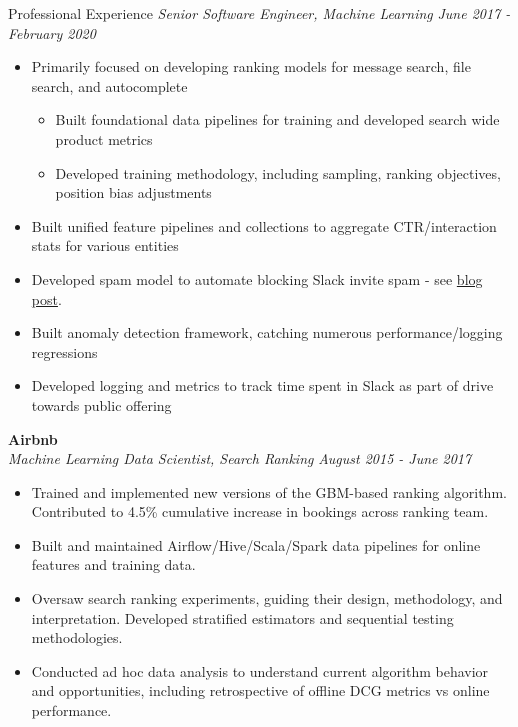 \documentclass{resume} %
\begin{document}
\begin{rSection}{Professional Experience}
{\em Senior Software Engineer, Machine Learning} \hfill {\em June 2017 - February 2020} \vspace{0.1em} 
\begin{itemize} \itemsep -0.2em
	\item Primarily focused on developing ranking models for message search, file search, and autocomplete
	\vspace{-0.2em}
        \begin{itemize} \itemsep -0.2em
        	\item Built foundational data pipelines for training and developed search wide product metrics
        	\item Developed training methodology, including sampling, ranking objectives, position bias adjustments
		\end{itemize}
	\item Built unified feature pipelines and collections to aggregate CTR/interaction stats for various entities
	\item Developed spam model to automate blocking Slack invite spam - see \href{https://slack.engineering/blocking-slack-invite-spam-with-machine-learning/}{blog post}.
	\item Built anomaly detection framework, catching numerous performance/logging regressions
	\item Developed logging and metrics to track time spent in Slack as part of drive towards public offering
\end{itemize}

{\bf Airbnb} \\
{\em Machine Learning Data Scientist, Search Ranking} \hfill {\em August 2015 - June 2017} \vspace{0.1em} 
\vspace{-0.2em}
\begin{itemize} \itemsep -0.2em
    \item Trained and implemented new versions of the GBM-based ranking algorithm. Contributed to 4.5\% cumulative increase in bookings across ranking team.
    \item Built and maintained Airflow/Hive/Scala/Spark data pipelines for online features and training data.
    \item Oversaw search ranking experiments, guiding their design, methodology, and interpretation. Developed stratified estimators and sequential testing methodologies.
    \item Conducted ad hoc data analysis to understand current algorithm behavior and opportunities, including retrospective of offline DCG metrics vs online performance.
\end{itemize}



\end{rSection}
\end{document}
